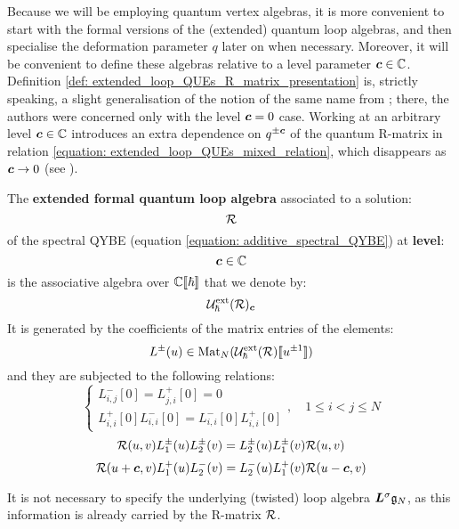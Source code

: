         Because we will be employing quantum vertex algebras, it is more convenient to start with the formal versions of the (extended) quantum loop algebras, and then specialise the deformation parameter $q$ later on when necessary. Moreover, it will be convenient to define these algebras relative to a level parameter $\boldsymbol{c} \in \mathbb{C}$. Definition \ref{def: extended_loop_QUEs_R_matrix_presentation} is, strictly speaking, a slight generalisation of the notion of the same name from \cite{guay_regelskis_wendlandt_R_matrix_presentation_of_loop_QUEs}; there, the authors were concerned only with the level $\boldsymbol{c} = 0$ case. Working at an arbitrary level $\boldsymbol{c} \in \mathbb{C}$ introduces an extra dependence on $q^{\pm \boldsymbol{c}}$ of the quantum R-matrix in relation \eqref{equation: extended_loop_QUEs_mixed_relation}, which disappears as $\boldsymbol{c} \to 0$ (see \cite[Remark 3.6]{guay_regelskis_wendlandt_R_matrix_presentation_of_loop_QUEs}). 

        \begin{definition} \label{def: extended_loop_QUEs_R_matrix_presentation}
            The \textbf{extended formal quantum loop algebra} associated to a solution:
                $$\mathcal{R}$$
            of the spectral QYBE (equation \eqref{equation: additive_spectral_QYBE}) at \textbf{level}:
                $$\boldsymbol{c} \in \mathbb{C}$$
            is the associative algebra over $\mathbb{C}[\![\hbar]\!]$ that we denote by:
                $$\mathcal{U}_{\hbar}^{\mathrm{ext}}(\mathcal{R})_{\boldsymbol{c}}$$
            It is generated by the coefficients of the matrix entries of the elements:
                $$L^{\pm}(u) \in \operatorname{Mat}_N( \mathcal{U}_{\hbar}^{\mathrm{ext}}(\mathcal{R})[\![u^{\pm 1}]\!] )$$
            and they are subjected to the following relations:
                $$
                    \begin{cases}
                        L_{i, j}^-[0] = L_{j, i}^+[0] = 0
                        \\
                        L_{i, i}^+[0] L_{i, i}^-[0] = L_{i, i}^-[0] L_{i, i}^+[0]
                    \end{cases}, \quad 1 \leq i < j \leq N
                $$
                \begin{equation} \label{equation: extended_loop_QUE_RLL_relation}
                    \mathcal{R}(u, v) L_1^{\pm}(u) L_2^{\pm}(v) = L_2^{\pm}(u) L_1^{\pm}(v) \mathcal{R}(u, v)
                \end{equation}
                \begin{equation} \label{equation: extended_loop_QUEs_mixed_relation}
                    \mathcal{R}(u + \boldsymbol{c}, v) L_1^+(u) L_2^-(v) = L_2^-(u) L_1^+(v) \mathcal{R}(u - \boldsymbol{c}, v)
                \end{equation}
        \end{definition}
        \begin{remark}
            It is not necessary to specify the underlying (twisted) loop algebra $\boldsymbol{L}^{\sigma} \mathfrak{g}_N$, as this information is already carried by the R-matrix $\mathcal{R}$.
        \end{remark}

